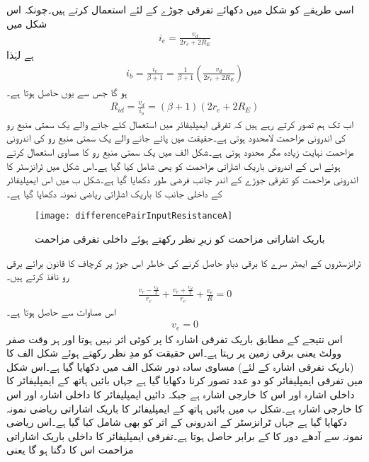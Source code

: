 اسی طریقے کو شکل   میں دکھائے تفرقی جوڑے کے لئے استعمال کرتے ہیں۔چونکہ اس شکل میں
\begin{align}
i_e=\frac{v_d}{2 r_e+2 R_E}
\end{align}
ہے لہٰذا
\begin{align}
i_b=\frac{i_e}{\beta+1}=\frac{1}{\beta+1} \left(\frac{v_d}{2 r_e +2 R_E} \right )
\end{align}
ہو گا جس سے  یوں حاصل ہوتا ہے۔
\begin{align}
R_{id}=\frac{v_d}{i_b}=\left(\beta+1 \right ) \left(2 r_e+2 R_E \right )
\end{align}
اب تک ہم تصور کرتے رہے ہیں کہ تفرقی ایمپلیفائر میں استعمال کئے جانے والے یک سمتی  منبع رو کی اندرونی مزاحمت لامحدود ہوتی ہے۔حقیقت میں پائے جانے والے یک سمتی  منبع رو کی اندرونی مزاحمت نہایت زیادہ مگر محدود ہوتی ہے۔شکل  الف میں یک سمتی  منبع رو کا مساوی  استعمال کرتے ہوئے اس کے اندرونی باریک اشاراتی مزاحمت   کو بھی شامل کیا گیا ہے۔اس شکل میں ٹرانزسٹر کا اندرونی مزاحمت   کو تفرقی جوڑے کے اندر جانب فرضی طور دکھایا گیا ہے۔شکل  ب میں اس ایمپلیفائر کے داخلی جانب کا باریک اشاراتی ریاضی نمونہ دکھایا گیا ہے۔
\begin{figure}
\centering
\texttt{[image: differencePairInputResistanceA]}
\caption{باریک اشاراتی مزاحمت کو زیرِ نظر رکھتے ہوئے داخلی تفرقی مزاحمت}
\label{شکل_باریک_اشاراتی_مزاحمت_کو_زیر_نظر}
\end{figure}
ٹرانزسٹروں کے ایمٹر سرے کا برقی دباو  حاصل کرنے کی خاطر اس جوڑ پر کرچاف کا قانون برائے برقی رو نافذ کرتے ہیں۔
\begin{align}
\frac{v_e - \frac{v_d}{2}}{r_e} + \frac{v_e + \frac{v_d}{2}}{r_e} +\frac{v_e}{R}=0
\end{align}
اس مساوات سے حاصل ہوتا ہے۔
\begin{align}\label{مساوات_تفرقی_جوڑا_تفرقی_اشارے_کے_لئے_جوڑے_کی_مخارج_برقی_زمین_ہے}
v_e=0
\end{align}
اس نتیجے کے مطابق باریک تفرقی اشارہ   کا  پر کوئی اثر نہیں ہوتا اور    ہر وقت صفر وولٹ یعنی برقی زمین پر رہتا ہے۔اس حقیقت کو مدِ نظر رکھتے ہوئے شکل  الف  کا (باریک تفرقی اشارہ کے لئے) مساوی سادہ دور شکل  الف میں دکھایا گیا ہے۔اس شکل میں تفرقی ایمپلیفائر کو دو عدد   تصور کرنا دکھایا گیا ہے جہاں بائیں ہاتھ کے ایمپلیفائر کا داخلی اشارہ  اور اس کا خارجی اشارہ  ہے جبکہ دائیں ایمپلیفائر کا داخلی اشارہ  اور اس کا خارجی اشارہ  ہے۔شکل  ب میں بائیں ہاتھ کے ایمپلیفائر کا باریک اشاراتی ریاضی نمونہ دکھایا گیا ہے جہاں ٹرانزسٹر کے اندرونی   کے اثر کو بھی شامل کیا گیا ہے۔اس  ریاضی نمونہ سے آدھے دور کا    کے برابر حاصل ہوتا ہے۔تفرقی ایمپلیفائر کا داخلی باریک اشاراتی مزاحمت اس کا دگنا ہو گا یعنی
